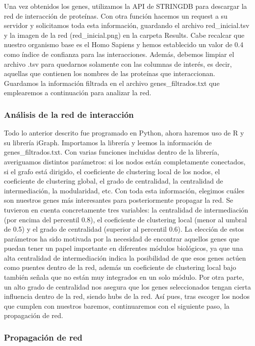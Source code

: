 Una vez obtenidos los genes, utilizamos la API de STRINGDB para descargar la red de interacción de proteínas. Con otra función hacemos un request a su servidor y solicitamos toda esta información, guardando el archivo red_inicial.tsv y la imagen de la red (red_inicial.png) en la carpeta Results. Cabe recalcar que nuestro organismo base es el Homo Sapiens y hemos establecido un valor de 0.4 como índice de confianza para las interacciones. Además, debemos limpiar el archivo .tsv para quedarnos solamente con las columnas de interés, es decir, aquellas que contienen los nombres de las proteínas que interaccionan. Guardamos la información filtrada en el archivo genes_filtrados.txt que emplearemos a continuación para analizar la red.

\subsubsection{Análisis de la red de interacción}
Todo lo anterior descrito fue programado en Python, ahora haremos uso de R y su librería iGraph. Importamos la librería y leemos la información de genes_filtrados.txt. Con varias funciones incluidas dentro de la librería, averiguamos distintos parámetros: si los nodos están completamente conectados, si el grafo está dirigido, el coeficiente de clustering local de los nodos, el coeficiente de clustering global, el grado de centralidad, la centralidad de intermediación, la modularidad, etc. Con toda esta información, elegimos cuáles son nuestros genes más interesantes para posteriormente propagar la red. Se tuvieron en cuenta concretamente tres variables: la centralidad de intermediación (por encima del percentil 0.8), el coeficiente de clustering local (menor al umbral de 0.5) y el grado de centralidad (superior al percentil 0.6). La elección de estos parámetros ha sido motivada por la necesidad de encontrar aquellos genes que puedan tener un papel importante en diferentes módulos biológicos, ya que una alta centralidad de intermediación indica la posibilidad de que esos genes actúen como puentes dentro de la red, además un coeficiente de clustering local bajo también señala que no están muy integrados en un solo módulo. Por otra parte, un alto grado de centralidad nos asegura que los genes seleccionados tengan cierta influencia dentro de la red, siendo hubs de la red. Así pues, tras escoger los nodos que cumplen con nuestros baremos, continuaremos con el siguiente paso, la propagación de red.

\subsubsection{Propagación de red}


